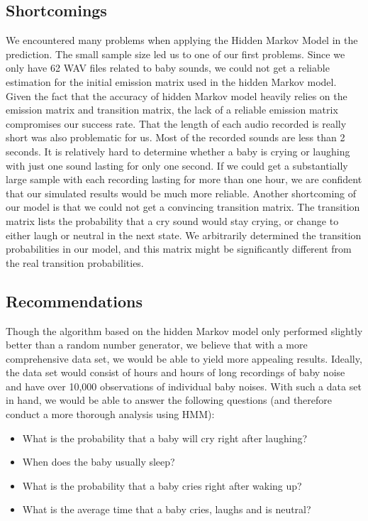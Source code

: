 \documentclass[paper=a4, fontsize=11pt]{scrartcl}
\numberwithin{equation}{section}
\numberwithin{figure}{section}
\numberwithin{table}{section}
\begin{document}
\subsection{Shortcomings}\label{subsec:hmmshort}
We encountered many problems when applying the Hidden Markov Model in the prediction. The small sample size led us to one of our first problems. Since we only have 62 WAV files related to baby sounds, we could not get a reliable estimation for the initial emission matrix used in the hidden Markov model. Given the fact that the accuracy of hidden Markov model heavily relies on the emission matrix and transition matrix, the lack of a reliable emission matrix compromises our success rate. That the length of each audio recorded is really short was also problematic for us. Most of the recorded sounds are less than 2 seconds. It is relatively hard to determine whether a baby is crying or laughing with just one sound lasting for only one second. If we could get a substantially large sample with each recording lasting for more than one hour, we are confident that our simulated results would be much more reliable. Another shortcoming of our model is that we could not get a convincing transition matrix. The transition matrix lists the probability that a cry sound would stay crying, or change to either laugh or neutral in the next state. We arbitrarily determined the transition probabilities in our model, and this matrix might be significantly different from the real transition probabilities.

\subsection{Recommendations}
Though the algorithm based on the hidden Markov model only performed slightly better than a random number generator, we believe that with a more comprehensive data set, we would be able to yield more appealing results. Ideally, the data set would consist of hours and hours of long recordings of baby noise and have over 10,000 observations of individual baby noises. With such a data set in hand, we would be able to answer the following questions (and therefore conduct a more thorough analysis using HMM):

\begin{itemize}
	\item What is the probability that a baby will cry right after laughing?
    \item When does the baby usually sleep?
    \item What is the probability that a baby cries right after waking up?
    \item What is the average time that a baby cries, laughs and is neutral? 
\end{itemize}
\end{document}
